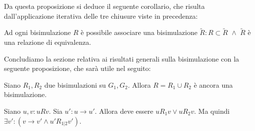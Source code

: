 Da questa proposizione si deduce il seguente corollario, che risulta dall'applicazione iterativa delle tre chiusure viste in precedenza:
\begin{corollary}
    Ad ogni bisimulazione $R$ è possibile associare una bisimulazione $\widetilde{R} : R \subset \widetilde{R} \,\,\land\,\, \widetilde{R}$ è una relazione di equivalenza.
    \label{cor:bisimulation_eqrel}
\end{corollary}
Concludiamo la sezione relativa ai risultati generali sulla bisimulazione con la seguente proposizione, che sarà utile nel seguito:
\begin{proposition}
    Siano $R_1, R_2$ due bisimulazioni su $G_1, G_2$. Allora $R = R_1 \cup R_2$ è ancora una bisimulazione.
    \label{obs:bisimulation_union}
\end{proposition}
\begin{proof2}
    Siano $u,v : u R v$. Sia $u' : u \to u'$. Allora deve essere $u R_1 v \lor u R_2 v$. Ma quindi $\exists v' : (v \to v' \land u' R_{1|2} v')$.
\end{proof2}

